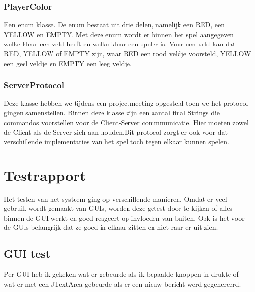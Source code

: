 \documentclass[12pt]{article}
\begin{document}
\subsubsection{PlayerColor}
Een enum klasse. De enum bestaat uit drie delen, namelijk een RED, een YELLOW en EMPTY. Met deze enum wordt er binnen het spel aangegeven welke kleur een veld heeft en welke kleur een speler is. Voor een veld kan dat RED, YELLOW of EMPTY zijn, waar RED een rood veldje voorsteld, YELLOW een geel veldje en EMPTY een leeg veldje.
\subsubsection{ServerProtocol}
Deze klasse hebben we tijdens een projectmeeting opgesteld toen we het protocol gingen samenstellen. Binnen deze klasse zijn een aantal final Strings die commandos voorstellen voor de Client-Server commmunicatie. Hier moeten zowel de Client als de Server zich aan houden.Dit protocol zorgt er ook voor dat verschillende implementaties van het spel toch tegen elkaar kunnen spelen.

\section{Testrapport}
Het testen van het systeem ging op verschillende manieren. Omdat er veel gebruik wordt gemaakt van GUIs, worden deze getest door te kijken of alles binnen de GUI werkt en goed reageert op invloeden van buiten. Ook is het voor de GUIs belangrijk dat ze goed in elkaar zitten en niet raar er uit zien.\\
\subsection{GUI test}
Per GUI heb ik gekeken wat er gebeurde als ik bepaalde knoppen in drukte of wat er met een JTextArea gebeurde als er een nieuw bericht werd gegenereerd.
\end{document}

